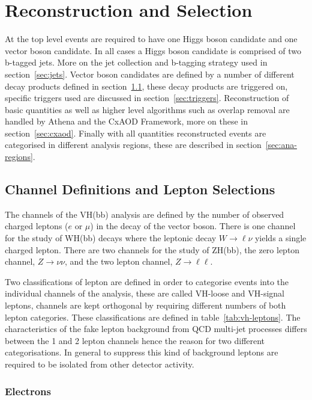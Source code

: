 \chapter{Reconstruction and Selection}%
\label{sec:method}

At the top level events are required to have one Higgs boson candidate and one
vector boson candidate. In all cases a Higgs boson candidate is comprised of two
b-tagged jets. More on the jet collection and b-tagging strategy used in
section~\ref{sec:jets}. Vector boson candidates are defined by a number of
different decay products defined in section~\ref{sec:channels-and-selections},
these decay products are triggered on, specific triggers used are discussed in
section~\ref{sec:triggers}. Reconstruction of basic quantities as well as higher
level algorithms such as overlap removal are handled by Athena and the CxAOD
Framework, more on these in section~\ref{sec:cxaod}. Finally with all quantities
reconstructed events are categorised in different analysis regions, these are
described in section~\ref{sec:ana-regions}.

\section{Channel Definitions and Lepton Selections}%
\label{sec:channels-and-selections}

The channels of the VH(bb) analysis are defined by the number of observed
charged leptons ($e$ or $\mu$) in the decay of the vector boson. There is one
channel for the study of WH(bb) decays where the leptonic decay $W \rightarrow
\ell\nu$ yields a single charged lepton. There are two channels for the study of
ZH(bb), the zero lepton channel, $Z \rightarrow \nu\nu$, and the two lepton
channel, $Z \rightarrow \ell\ell$. 

Two classifications of lepton are defined in order to categorise events into the
individual channels of the analysis, these are called VH-loose and VH-signal
leptons, channels are kept orthogonal by requiring different numbers of both
lepton categories. These classifications are defined in
table~\ref{tab:vh-leptons}. The characteristics of the fake lepton background
from QCD multi-jet processes differs between the 1 and 2 lepton channels hence
the reason for two different categorisations. In general to suppress this kind
of background leptons are required to be isolated from other detector activity.


\subsection{Electrons}
\label{subsec:electrons}

